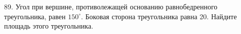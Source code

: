 89. Угол при вершине, противолежащей основанию равнобедренного треугольника, равен $150^\circ.$ Боковая сторона треугольника равна 20. Найдите площадь этого треугольника.\\
